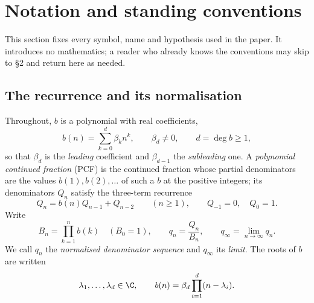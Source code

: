 %

\section{Notation and standing conventions}\label{sec:notation}

This section fixes every symbol, name and hypothesis used in the paper. It
introduces no mathematics; a reader who already knows the conventions may skip
to \S2 and return here as needed.

\subsection{The recurrence and its normalisation}\label{ssec:recurrence}

Throughout, $b$ is a polynomial with real coefficients,
\[
  b(n)=\sum_{k=0}^{d}\beta_k n^k ,\qquad \beta_d\neq0,\qquad d=\deg b\ge1 ,
\]
so that $\beta_d$ is the \emph{leading} coefficient and $\beta_{d-1}$ the
\emph{subleading} one. A \emph{polynomial continued fraction} (PCF) is the
continued fraction whose partial denominators are the values $b(1),b(2),\dots$
of such a $b$ at the positive integers; its denominators $Q_n$ satisfy the
three-term recurrence
\begin{equation}\label{eq:n-rec}
  Q_n=b(n)Q_{n-1}+Q_{n-2}\qquad(n\ge1),\qquad Q_{-1}=0,\quad Q_0=1 .
\end{equation}
Write
\begin{equation}\label{eq:n-norm}
  B_n=\prod_{k=1}^{n}b(k)\quad(B_0=1),\qquad
  q_n=\frac{Q_n}{B_n},\qquad
  q_\infty=\lim_{n\to\infty}q_n .
\end{equation}
We call $q_n$ the \emph{normalised denominator sequence} and $q_\infty$ its
\emph{limit}. The roots of $b$ are written
\begin{equation}\label{eq:n-roots}
  \lambda_1,\dots,\lambda_d\in\C,\qquad b(n)=\beta_d\prod_{i=1}^{d}(n-\lambda_i).
\end{equation}

